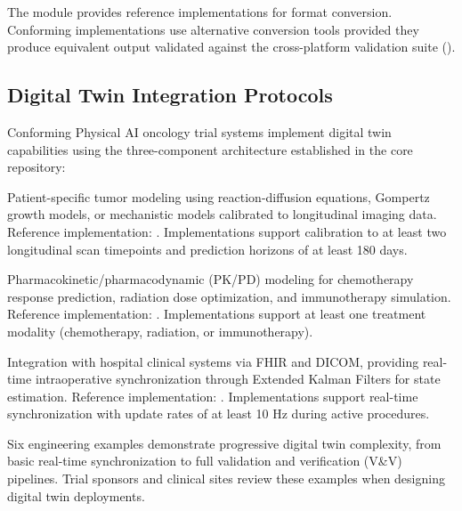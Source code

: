 \documentclass[11pt,letterpaper]{article}
\begin{document}
The  module provides reference implementations for format conversion. Conforming implementations \MAY{} use alternative conversion tools provided they produce equivalent output validated against the cross-platform validation suite ().

\subsection{Digital Twin Integration Protocols}

Conforming Physical AI oncology trial systems \SHALL{} implement digital twin capabilities using the three-component architecture established in the core repository:

\begin{description}[leftmargin=3.5cm, style=sameline]
  \item[Tumor Twin Pipeline] Patient-specific tumor modeling using reaction-diffusion equations, Gompertz growth models, or mechanistic models calibrated to longitudinal imaging data. Reference implementation: . Implementations \SHALL{} support calibration to at least two longitudinal scan timepoints and prediction horizons of at least 180 days.

  \item[Treatment Simulator] Pharmacokinetic/pharmacodynamic (PK/PD) modeling for chemotherapy response prediction, radiation dose optimization, and immunotherapy simulation. Reference implementation: . Implementations \SHALL{} support at least one treatment modality (chemotherapy, radiation, or immunotherapy).

  \item[Clinical DT Interface] Integration with hospital clinical systems via FHIR and DICOM, providing real-time intraoperative synchronization through Extended Kalman Filters for state estimation. Reference implementation: . Implementations \SHOULD{} support real-time synchronization with update rates of at least 10 Hz during active procedures.
\end{description}

Six engineering examples demonstrate progressive digital twin complexity, from basic real-time synchronization to full validation and verification (V\&V) pipelines. Trial sponsors and clinical sites \SHOULD{} review these examples when designing digital twin deployments.
\end{document}
